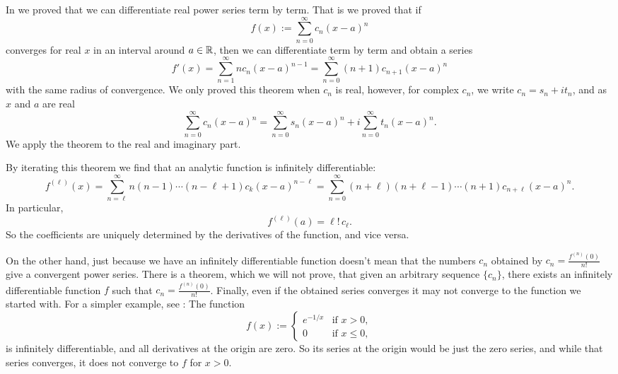 In  we proved that we can
differentiate real power series term by term.  That is
we proved that if
\begin{equation*}
f(x) := \sum_{n=0}^\infty c_n {(x-a)}^n
\end{equation*}
converges for real $x$ in an interval around $a \in {\mathbb{R}}$, then we can differentiate
term by term and obtain a series
\begin{equation*}
f'(x) =
\sum_{n=1}^\infty n c_n {(x-a)}^{n-1}
=
\sum_{n=0}^\infty (n+1)c_{n+1} {(x-a)}^{n} 
\end{equation*}
with the same radius of convergence.
We only proved this theorem when $c_n$ is real, however, for complex $c_n$,
we write
$c_n = s_n + i t_n$, and as $x$ and $a$ are real
\begin{equation*}
\sum_{n=0}^\infty c_n {(x-a)}^n
=
\sum_{n=0}^\infty s_n {(x-a)}^n
+
i
\sum_{n=0}^\infty t_n {(x-a)}^n .
\end{equation*}
We apply the theorem to the real and
imaginary part.

By iterating this theorem we find that an
analytic function is infinitely differentiable:
\begin{equation*}
f^{(\ell)}(x) =
\sum_{n=\ell}^\infty n(n-1)\cdots(n-\ell+1)c_k {(x-a)}^{n-\ell}
=
\sum_{n=0}^\infty (n+\ell)(n+\ell-1)\cdots (n+1) c_{n+\ell} {(x-a)}^{n} .
\end{equation*}
In particular,
\begin{equation} \label{eq:formulaforpscoeffs}
f^{(\ell)}(a) = \ell! \, c_\ell .
\end{equation}
So the coefficients are uniquely determined by the derivatives of the
function, and vice versa.

On the other hand, just because we have an infinitely differentiable
function doesn't mean that the numbers $c_n$ obtained by
$c_n = \frac{f^{(n)}(0)}{n!}$ give a convergent power series.
There is a theorem, which we will not prove,
that given an arbitrary sequence $\{ c_n \}$, there exists an
infinitely differentiable function $f$ such that
$c_n = \frac{f^{(n)}(0)}{n!}$.  Finally, even if the obtained series
converges it may not converge to the function we started with.
For a simpler example,
see :  The
function
\begin{equation*}
f(x) :=
\begin{cases}
e^{-1/x} & \text{if } x > 0,\\
0        & \text{if } x \leq 0,
\end{cases}
\end{equation*}
is infinitely differentiable, and all derivatives at the origin are zero.
So
its series at the origin would be just the zero series, and while that
series converges, it does not converge to $f$ for $x > 0$.

